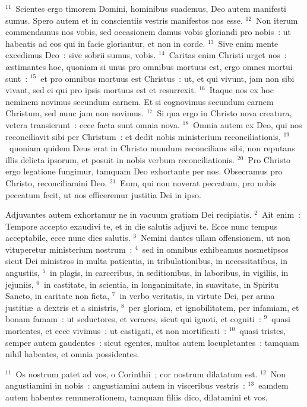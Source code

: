 ${}^{11}$~Scientes ergo timorem Domini, hominibus suademus, Deo autem manifesti sumus. Spero autem et in conscientiis vestris manifestos nos esse.
${}^{12}$~Non iterum commendamus nos vobis, sed occasionem damus vobis gloriandi pro nobis~: ut habeatis ad eos qui in facie gloriantur, et non in corde.
${}^{13}$~Sive enim mente excedimus Deo~: sive sobrii sumus, vobis.
${}^{14}$~Caritas enim Christi urget nos~: \ae stimantes hoc, quoniam si unus pro omnibus mortuus est, ergo omnes mortui sunt~:
${}^{15}$~et pro omnibus mortuus est Christus~: ut, et qui vivunt, jam non sibi vivant, sed ei qui pro ipsis mortuus est et resurrexit.
${}^{16}$~Itaque nos ex hoc neminem novimus secundum carnem. Et si cognovimus secundum carnem Christum, sed nunc jam non novimus.
${}^{17}$~Si qua ergo in Christo nova creatura, vetera transierunt~: ecce facta sunt omnia nova.
${}^{18}$~Omnia autem ex Deo, qui nos reconciliavit sibi per Christum~: et dedit nobis ministerium reconciliationis,
${}^{19}$~quoniam quidem Deus erat in Christo mundum reconcilians sibi, non reputans illis delicta ipsorum, et posuit in nobis verbum reconciliationis.
${}^{20}$~Pro Christo ergo legatione fungimur, tamquam Deo exhortante per nos. Obsecramus pro Christo, reconciliamini Deo.
${}^{21}$~Eum, qui non noverat peccatum, pro nobis peccatum fecit, ut nos efficeremur justitia Dei in ipso.

\lettrine[lines=3,image=true,loversize=0.05,lraise=-0.03]{A}{}djuvantes autem exhortamur ne in vacuum gratiam Dei recipiatis.
${}^{2}$~Ait enim~: Tempore accepto exaudivi te, et in die salutis adjuvi te. Ecce nunc tempus acceptabile, ecce nunc dies salutis.
${}^{3}$~Nemini dantes ullam offensionem, ut non vituperetur ministerium nostrum~:
${}^{4}$~sed in omnibus exhibeamus nosmetipsos sicut Dei ministros in multa patientia, in tribulationibus, in necessitatibus, in angustiis,
${}^{5}$~in plagis, in carceribus, in seditionibus, in laboribus, in vigiliis, in jejuniis,
${}^{6}$~in castitate, in scientia, in longanimitate, in suavitate, in Spiritu Sancto, in caritate non ficta,
${}^{7}$~in verbo veritatis, in virtute Dei, per arma justiti\ae\ a dextris et a sinistris,
${}^{8}$~per gloriam, et ignobilitatem, per infamiam, et bonam famam~: ut seductores, et veraces, sicut qui ignoti, et cogniti~:
${}^{9}$~quasi morientes, et ecce vivimus~: ut castigati, et non mortificati~:
${}^{10}$~quasi tristes, semper autem gaudentes~: sicut egentes, multos autem locupletantes~: tamquam nihil habentes, et omnia possidentes.


${}^{11}$~Os nostrum patet ad vos, o Corinthii~; cor nostrum dilatatum est.
${}^{12}$~Non angustiamini in nobis~: angustiamini autem in visceribus vestris~:
${}^{13}$~eamdem autem habentes remunerationem, tamquam filiis dico, dilatamini et vos.


